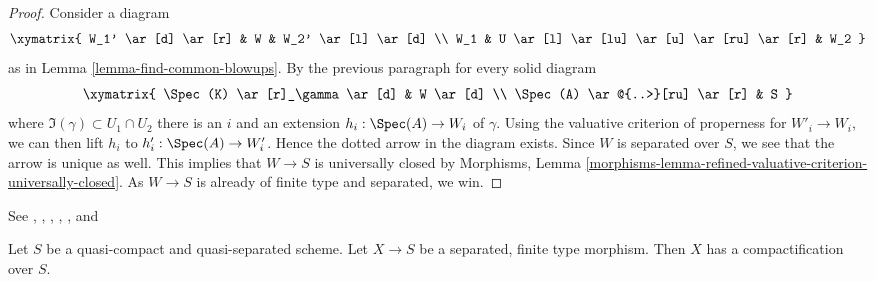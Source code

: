 \begin{proof}
\medskip\noindent
Consider a diagram
$$
\xymatrix{
W_1' \ar[d] \ar[r] & W & W_2' \ar[l] \ar[d] \\
W_1 & U \ar[l] \ar[lu] \ar[u] \ar[ru] \ar[r] & W_2
}
$$
as in Lemma \ref{lemma-find-common-blowups}. By the previous paragraph
for every solid diagram
$$
\xymatrix{
\Spec(K) \ar[r]_\gamma  \ar[d] & W \ar[d] \\
\Spec(A) \ar@{..>}[ru] \ar[r] & S
}
$$
where $\Im(\gamma) \subset U_1 \cap U_2$ there is an $i$ and
an extension $h_i : \Spec(A) \to W_i$ of $\gamma$.
Using the valuative criterion of properness for $W'_i \to W_i$,
we can then lift $h_i$ to $h'_i : \Spec(A) \to W'_i$.
Hence the dotted arrow in the diagram exists. Since $W$
is separated over $S$, we see that the arrow is unique as well.
This implies that $W \to S$ is universally closed by
Morphisms, Lemma
\ref{morphisms-lemma-refined-valuative-criterion-universally-closed}.
As $W \to S$ is already of finite type and separated, we win.
\end{proof}

\begin{theorem}
\label{theorem-nagata}
\begin{reference}
See \cite{Lutkebohmert}, \cite{Conrad-Nagata}, \cite{Nagata-1},
\cite{Nagata-2}, \cite{Nagata-3}, and \cite{Nagata-4}
\end{reference}
Let $S$ be a quasi-compact and quasi-separated scheme. Let
$X \to S$ be a separated, finite type morphism.
Then $X$ has a compactification over $S$.
\end{theorem}

